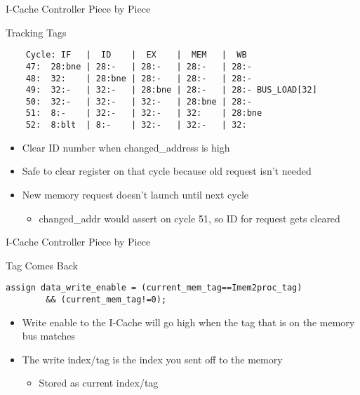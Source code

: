\documentclass[table,dvipsnames]{beamer}
\begin{document}
\begin{frame}[fragile]{I-Cache Controller Piece by Piece}
	\begin{block}{Tracking Tags}
	
	\begin{verbatim}
    Cycle: IF   |  ID    |  EX    |  MEM   |  WB
    47:  28:bne | 28:-   | 28:-   | 28:-   | 28:-
    48:  32:    | 28:bne | 28:-   | 28:-   | 28:-
    49:  32:-   | 32:-   | 28:bne | 28:-   | 28:- BUS_LOAD[32]
    50:  32:-   | 32:-   | 32:-   | 28:bne | 28:-
    51:  8:-    | 32:-   | 32:-   | 32:    | 28:bne
    52:  8:blt  | 8:-    | 32:-   | 32:-   | 32:     
	\end{verbatim}
	\begin{itemize}
		\item Clear ID number when changed\_address is high
		\item Safe to clear register on that cycle because old request isn't needed
		\item New memory request doesn't launch until next cycle
		\begin{itemize} \item changed\_addr would assert on cycle 51, so ID for request gets cleared \end{itemize}
		
	\end{itemize}

	\end{block}	
\end{frame}



\begin{frame}[fragile]{I-Cache Controller Piece by Piece}
	\begin{block}{Tag Comes Back}
	
	\begin{verbatim}
assign data_write_enable = (current_mem_tag==Imem2proc_tag) 
		&& (current_mem_tag!=0);	\end{verbatim}
	\begin{itemize}
		\item Write enable to the I-Cache will go high when the tag that is on the memory bus matches
		\item The write index/tag is the index you sent off to the memory
		\begin{itemize} \item Stored as current index/tag \end{itemize}
	\end{itemize}

	\end{block}	
\end{frame}
\end{document}
